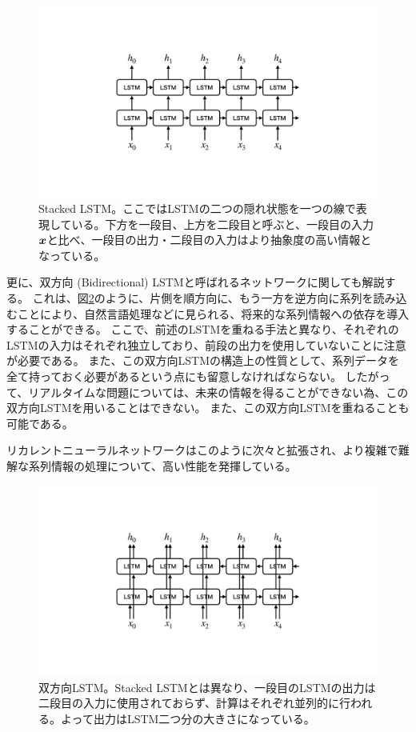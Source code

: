 \begin{figure}[htbp]
 \centering
 \includegraphics[trim = 0 200 0 200, width=1.0\textwidth, clip]{Figure/2DeepLearning/16StackedLSTM.png}
 \caption[Stacked LSTM]{Stacked LSTM。ここではLSTMの二つの隠れ状態を一つの線で表現している。下方を一段目、上方を二段目と呼ぶと、一段目の入力${\mbox{\boldmath{$x$}}}$と比べ、一段目の出力・二段目の入力はより抽象度の高い情報となっている。}
 \label{16StackedLSTM}
\end{figure}

更に、双方向 (Bidirectional) LSTMと呼ばれるネットワークに関しても解説する。
これは、図\ref{17BidirectionalLSTM}のように、片側を順方向に、もう一方を逆方向に系列を読み込むことにより、自然言語処理などに見られる、将来的な系列情報への依存を導入することができる。
ここで、前述のLSTMを重ねる手法と異なり、それぞれのLSTMの入力はそれぞれ独立しており、前段の出力を使用していないことに注意が必要である。
また、この双方向LSTMの構造上の性質として、系列データを全て持っておく必要があるという点にも留意しなければならない。
したがって、リアルタイムな問題については、未来の情報を得ることができない為、この双方向LSTMを用いることはできない。
また、この双方向LSTMを重ねることも可能である。

リカレントニューラルネットワークはこのように次々と拡張され、より複雑で難解な系列情報の処理について、高い性能を発揮している。

\begin{figure}[htbp]
 \centering
 \includegraphics[trim = 0 200 0 200, width=1.0\textwidth, clip]{Figure/2DeepLearning/17BidirectionalLSTM.png}
 \caption[双方向LSTM]{双方向LSTM。Stacked LSTMとは異なり、一段目のLSTMの出力は二段目の入力に使用されておらず、計算はそれぞれ並列的に行われる。よって出力はLSTM二つ分の大きさになっている。}
 \label{17BidirectionalLSTM}
\end{figure}

